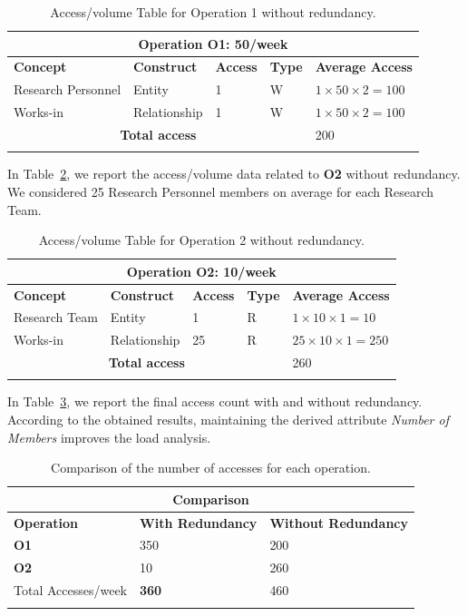 \begin{longtable}{|p{}|p{}|p{}|p{}|p{}|}
\hline
\multicolumn{5}{|c|}{\textbf{Operation O1: 50/week}}\\\hline
\textbf{Concept} & \textbf{Construct} & \textbf{Access} & \textbf{Type} & \textbf{Average Access} \\
\hline
Research Personnel & Entity & 1 & W & $1 \times 50 \times 2 = 100$\\
Works-in & Relationship & 1 & W & $1 \times 50 \times 2 = 100$\\
\hline
\multicolumn{4}{|c|}{\textbf{Total access}} & 200\\
\hline
\caption{Access/volume Table for Operation 1 without redundancy.}
\label{table:7}
\end{longtable}

In Table~\ref{table:8}, we report the access/volume data related to \textbf{O2} without redundancy. We considered 25 Research Personnel members on average for each Research Team.

\begin{longtable}{|p{}|p{}|p{}|p{}|p{}|}
\hline
\multicolumn{5}{|c|}{\textbf{Operation O2: 10/week}}\\\hline
\textbf{Concept} & \textbf{Construct} & \textbf{Access} & \textbf{Type} & \textbf{Average Access} \\
\hline
Research Team & Entity & 1 & R & $1 \times 10 \times 1 = 10$\\
Works-in & Relationship & 25 & R & $25 \times 10 \times 1 = 250$\\
\hline
\multicolumn{4}{|c|}{\textbf{Total access}} & 260\\
\hline
\caption{Access/volume Table for Operation 2 without redundancy.}
\label{table:8}
\end{longtable}

In Table~\ref{table:9}, we report the final access count with and without redundancy. According to the obtained results, maintaining the derived attribute \textit{Number of Members} improves the load analysis.

\begin{longtable}{|p{}|p{}|p{}|}
\hline
\multicolumn{3}{|c|}{\textbf{Comparison}}\\\hline
\textbf{Operation} & \textbf{With Redundancy} & \textbf{Without Redundancy}\\
\hline
\textbf{O1} &350 &200\\
\textbf{O2} &10 &260\\
\hline
Total Accesses/week  & \textbf{360} &460\\
\hline
\caption{Comparison of the number of accesses for each operation.}
\label{table:9}
\end{longtable}

